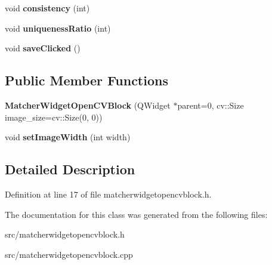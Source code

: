 \begin{DoxyCompactItemize}
\item 
\hypertarget{class_matcher_widget_open_c_v_block_ad07b256a3f33dd3b0b3554e73ed6abdc}{}void {\bfseries consistency} (int)\label{class_matcher_widget_open_c_v_block_ad07b256a3f33dd3b0b3554e73ed6abdc}

\item 
\hypertarget{class_matcher_widget_open_c_v_block_a1ba1a1ff91c6a455528af613b972f882}{}void {\bfseries uniqueness\+Ratio} (int)\label{class_matcher_widget_open_c_v_block_a1ba1a1ff91c6a455528af613b972f882}

\item 
\hypertarget{class_matcher_widget_open_c_v_block_a9c2f7a6be57cbf63079f2b32411c433c}{}void {\bfseries save\+Clicked} ()\label{class_matcher_widget_open_c_v_block_a9c2f7a6be57cbf63079f2b32411c433c}

\end{DoxyCompactItemize}
\subsection*{Public Member Functions}
\begin{DoxyCompactItemize}
\item 
\hypertarget{class_matcher_widget_open_c_v_block_a5f2d21ee8c7a9c429e251a4c1b470dae}{}{\bfseries Matcher\+Widget\+Open\+C\+V\+Block} (Q\+Widget $\ast$parent=0, cv\+::\+Size image\+\_\+size=cv\+::\+Size(0, 0))\label{class_matcher_widget_open_c_v_block_a5f2d21ee8c7a9c429e251a4c1b470dae}

\item 
\hypertarget{class_matcher_widget_open_c_v_block_a61613853ca6da5ed7ab349ef64833be5}{}void {\bfseries set\+Image\+Width} (int width)\label{class_matcher_widget_open_c_v_block_a61613853ca6da5ed7ab349ef64833be5}

\end{DoxyCompactItemize}


\subsection{Detailed Description}


Definition at line 17 of file matcherwidgetopencvblock.\+h.



The documentation for this class was generated from the following files\+:\begin{DoxyCompactItemize}
\item 
src/matcherwidgetopencvblock.\+h\item 
src/matcherwidgetopencvblock.\+cpp\end{DoxyCompactItemize}
